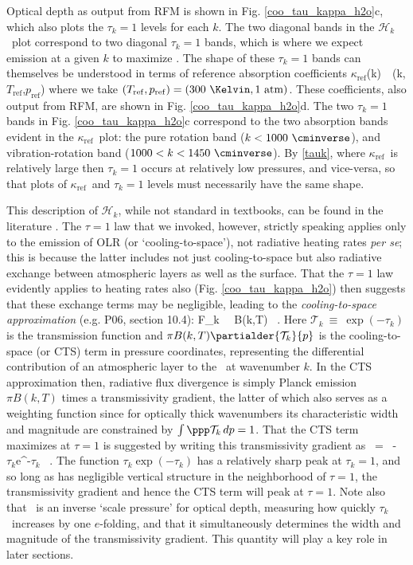 \documentclass[10pt]{article}
\newcommand{\trans}{\ensuremath{\mathcal{T}}}
\newcommand{\ch}{\ensuremath{\mathcal{H}}}
\newcommand{\chk}{\ensuremath{\ch_k}}
\newcommand{\tauk}{\ensuremath{\tau_k}}
\newcommand{\kapparef}{\ensuremath{\kappa_{\mathrm{ref}}}}
\newcommand{\Tref}{\ensuremath{T_{\mathrm{ref}}}}
\newcommand{\pref}{\ensuremath{p_{\mathrm{ref}}}}
\begin{document}
 Optical depth as output from RFM is shown in Fig. \ref{coo_tau_kappa_h2o}c, which also plots the $\tauk=1$ levels for each $k$. The two diagonal bands in the \chk\ plot correspond to two diagonal $\tauk=1$ bands, which is where we expect emission at a given $k$ to maximize \citep[e.g.][hereafter P06; we discuss the basis for this `$\tau=1$' law below]{petty2006}. The shape of these $\tauk=1$ bands can themselves be understood in terms of reference absorption coefficients 
 \beqn
  \kapparef(k)\ \equiv  \ \kappa(k,\Tref,\pref)
  \eeqn
  where we take $(\Tref,\pref)=(300\ \Kelvin, 1\ \text{atm})$. These coefficients, also output from RFM, are shown in  Fig. \ref{coo_tau_kappa_h2o}d. The two $\tauk=1$ bands  in Fig. \ref{coo_tau_kappa_h2o}c correspond to the two absorption bands evident in the \kapparef\ plot: the pure rotation band ($k < 1000\ \cminverse$), and vibration-rotation band ($1000 < k< 1450 \ \cminverse$). By \eqref{tauk}, where \kapparef\ is relatively large then $\tauk=1$  occurs at relatively low pressures,  and vice-versa, so that plots of \kapparef\ and $\tauk=1$ levels must necessarily have the same shape. 

This description of \chk, while not standard in textbooks, can be found in the literature \citep[e.g.][]{clough1992}. The $\tau=1$ law that we invoked, however, strictly speaking applies only to the emission of OLR (or `cooling-to-space'), not radiative heating rates \emph{per se}; this is because  the latter includes not just cooling-to-space but also radiative exchange between atmospheric layers as well as the surface. That the $\tau=1$ law evidently applies to heating rates also (Fig. \ref{coo_tau_kappa_h2o}) then suggests that these exchange terms may be negligible, leading to the  \emph{cooling-to-space approximation} (e.g. P06, section 10.4):  
\beqn
	\ppp F_k \ \approx \   \pi B(k,T) \partialder{\trans_k}{p} \  .
	\label{cts}
\eeqn
Here $\trans_k \ \equiv \ \exp(-\tauk)$ is the transmission function and $\pi B(k,T) \partialder{\trans_k}{p}$ is the cooling-to-space (or CTS) term in pressure coordinates, representing the differential contribution of an atmospheric layer to the \OLR\ at wavenumber $k$. In the CTS approximation then, radiative flux divergence is  simply Planck emission $\pi B(k,T)$ times a transmissivity gradient, the latter of which also serves as a weighting function since for optically thick wavenumbers its characteristic width and magnitude are constrained by $\int\ppp\trans_k \, dp = 1$. That the CTS term maximizes at $\tau=1$ is suggested by writing this transmissivity gradient as 
 \beqn
 	\partialder{\trans_k}{p} \ = \ -\partialder{\ln \tauk}{p} \tauk e^{-\tauk} \ .
	\label{trans_grad}
\eeqn
 The function $\tauk \exp(-\tauk)$ has a relatively sharp peak at $\tauk=1$, and so long as \partialder{\ln\tauk}{p}  has negligible vertical structure in the neighborhood of $\tau=1$, the transmissivity gradient and hence the CTS term will peak 
at $\tau=1$. Note also that \partialder{\ln\tauk}{p}\ is an inverse  `scale pressure' for optical depth, measuring how quickly \tauk\ increases by one $e$-folding, and that it simultaneously determines the width and magnitude of the transmissivity gradient. This quantity will play a key role in later sections.
\end{document}

